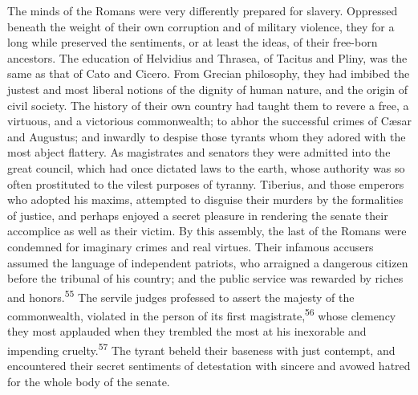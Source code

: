 
The minds of the Romans were very differently prepared for
slavery. Oppressed beneath the weight of their own corruption and
of military violence, they for a long while preserved the
sentiments, or at least the ideas, of their free-born ancestors.
The education of Helvidius and Thrasea, of Tacitus and Pliny, was
the same as that of Cato and Cicero. From Grecian philosophy,
they had imbibed the justest and most liberal notions of the
dignity of human nature, and the origin of civil society. The
history of their own country had taught them to revere a free, a
virtuous, and a victorious commonwealth; to abhor the successful
crimes of Cæsar and Augustus; and inwardly to despise those
tyrants whom they adored with the most abject flattery. As
magistrates and senators they were admitted into the great
council, which had once dictated laws to the earth, whose
authority was so often prostituted to the vilest purposes of
tyranny. Tiberius, and those emperors who adopted his maxims,
attempted to disguise their murders by the formalities of
justice, and perhaps enjoyed a secret pleasure in rendering the
senate their accomplice as well as their victim. By this
assembly, the last of the Romans were condemned for imaginary
crimes and real virtues. Their infamous accusers assumed the
language of independent patriots, who arraigned a dangerous
citizen before the tribunal of his country; and the public
service was rewarded by riches and honors.\textsuperscript{55} The servile judges
professed to assert the majesty of the commonwealth, violated in
the person of its first magistrate,\textsuperscript{56} whose clemency they most
applauded when they trembled the most at his inexorable and
impending cruelty.\textsuperscript{57} The tyrant beheld their baseness with just
contempt, and encountered their secret sentiments of detestation
with sincere and avowed hatred for the whole body of the senate.


